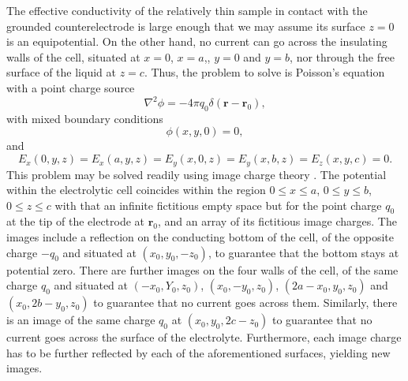 \documentclass{article}
\begin{document}
The effective conductivity of the relatively thin sample in contact
with the grounded counterelectrode is large enough that we may assume its
surface $z=0$ is an equipotential.
On the other hand, no current can go across the insulating walls of
the cell, situated at $x=0$, $x=a$,, $y=0$ and $y=b$, nor through the
free surface of the liquid at $z=c$. Thus, the problem to solve is Poisson's
equation with a point charge source
\begin{equation}
  \label{eq:poisson}
  \nabla^2\phi=-4\pi q_0\delta(\bm r-\bm r_0),
\end{equation}
with mixed boundary conditions
\begin{equation}
  \label{eq:ground}
  \phi(x,y,0)=0,
\end{equation}
and
\begin{equation}
E_x(0, y ,z)= E_x(a, y ,z)=E_y(x, 0 ,z)=E_y(x, b
,z)=E_z(x, y ,c)=0.
\end{equation}
This problem may be solved readily using image charge theory \cite{T1,T2}.
The potential within the electrolytic cell coincides
within the region $0\le x\le a$, $0\le y \le b$, $0\le z\le c$
with that an infinite fictitious empty space but for the point charge
$q_0$ at the tip of the electrode at $\bm r_0$, and an array of its fictitious image
charges. The images include a reflection on the conducting bottom of the
cell, of the opposite charge $-q_0$ and situated at $(x_0, y_0,-z_0)$,
to guarantee that the bottom stays at potential zero.
There are further images on the four walls of the cell, of the same charge $q_0$
and situated at $(-x_0,Y_0,z_0)$, $(x_0,-y_0, z_0)$, $(2a-x_0, y_0,
z_0)$ and $(x_0, 2b-y_0,z_0)$ to guarantee that no current goes across
them. Similarly, there is an image of the same charge $q_0$ at
$(x_0,y_0,2c-z_0)$ to guarantee that no current goes across the
surface of the electrolyte. Furthermore, each image charge has to be
further reflected by each of the aforementioned surfaces, yielding new
images.
\end{document}
